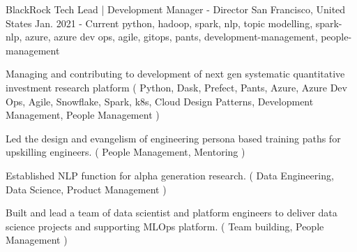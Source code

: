 \cventry
    {BlackRock} %
    {Tech Lead | Development Manager - Director} %
    {San Francisco, United States} %
    {Jan. 2021 - Current} %
    { python, hadoop, spark, nlp, topic modelling, spark-nlp, azure, azure dev ops, agile, gitops, pants, development-management, people-management} %
    {
    \begin{cvitems} %
       \item { Managing and contributing to development of next gen systematic quantitative investment research platform ( Python, Dask, Prefect, Pants, Azure, Azure Dev Ops, Agile, Snowflake, Spark, k8s, Cloud Design Patterns, Development Management, People Management ) }
       \item { Led the design and evangelism of engineering persona based training paths for upskilling engineers. ( People Management, Mentoring ) }
       \item { Established NLP function for alpha generation research. ( Data Engineering, Data Science, Product Management ) }
       \item { Built and lead a team of data scientist and platform engineers to deliver data science projects and supporting MLOps platform. ( Team building, People Management ) }
    \end{cvitems}
    }

